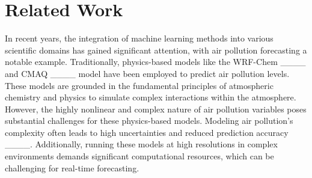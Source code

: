 \section{Related Work}
\label{related_work}

In recent years, the integration of machine learning methods into various scientific domains has gained significant attention, with air pollution forecasting a notable example. 
Traditionally, physics-based models like the WRF-Chem ____ and CMAQ ____ model have been employed to predict air pollution levels. 
These models are grounded in the fundamental principles of atmospheric chemistry and physics to simulate complex interactions within the atmosphere.
However, the highly nonlinear and complex nature of air pollution variables poses substantial challenges for these physics-based models. 
Modeling air pollution's complexity often leads to high uncertainties and reduced prediction accuracy ____. 
Additionally, running these models at high resolutions in complex environments demands significant computational resources, which can be challenging for real-time forecasting.

